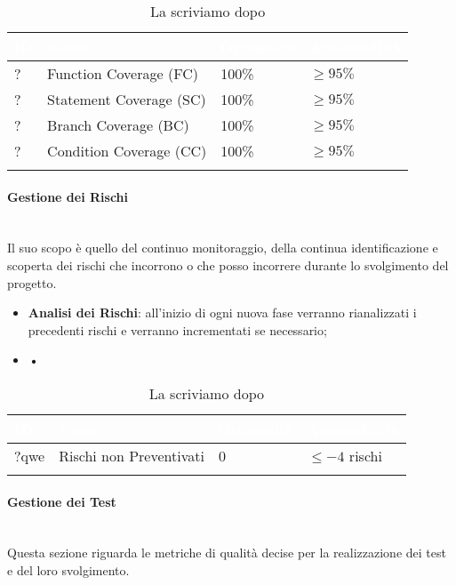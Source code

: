 \begin{longtable}{|C{.15\textwidth}|C{.24\textwidth}|C{.24\textwidth}|C{.24\textwidth}|}
\hline
{}\textbf{\textcolor{white}{ID}} & \textbf{\textcolor{white}{Nome}} & \textbf{\textcolor{white}{Ottimalità}} & \textbf{\textcolor{white}{Accettabilità}}\\
\hline \hline
\endfirsthead
? & Function Coverage (FC) & 100\% & $\geqslant 95\%$ \\
\hline
\hline
{} ? & Statement Coverage (SC) & 100\% & $\geqslant 95\%$ \\
\hline
? & Branch Coverage (BC) & 100\% & $\geqslant 95\%$ \\
\hline
{}? & Condition Coverage (CC) & 100\% & $\geqslant 95\%$ \\
\hline
\caption{La scriviamo dopo}
\label{La scriviamo dopo}
\end{longtable}

\paragraph{Gestione dei Rischi}\-\\
Il suo scopo è quello del continuo monitoraggio, della continua identificazione e scoperta dei rischi che incorrono o che posso incorrere durante lo svolgimento del progetto. 
\begin{itemize}
	\item \textbf{Analisi dei Rischi}: all'inizio di ogni nuova fase verranno rianalizzati i precedenti rischi e verranno incrementati se necessario;
	\item \textbf{•}
\end{itemize}

\begin{longtable}{|C{.15\textwidth}|C{.24\textwidth}|C{.24\textwidth}|C{.24\textwidth}|}
\hline
{}\textbf{\textcolor{white}{ID}} & \textbf{\textcolor{white}{Nome}} & \textbf{\textcolor{white}{Ottimalità}} & \textbf{\textcolor{white}{Accettabilità}}\\
\hline \hline
\endfirsthead
?qwe & Rischi non Preventivati & 0 & $ \leqslant -4$ rischi \\
\hline
\caption{La scriviamo dopo}
\label{La scriviamo dopo}
\end{longtable}

\paragraph{Gestione dei Test}\-\\
Questa sezione riguarda le metriche di qualità decise per la realizzazione dei test e del loro svolgimento. 
